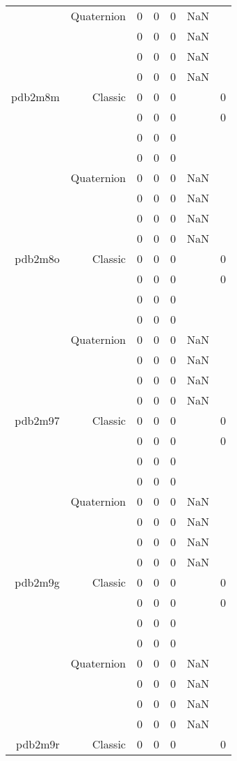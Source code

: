 \begin{xltabular}{\textwidth}{r|rcccSc}
& Quaternion & 0 & 0 & 0 & NaN & \\
& & 0 & 0 & 0 & NaN & \\
& & 0 & 0 & 0 & NaN & \\
& & 0 & 0 & 0 & NaN & \\ \addlinespace
pdb2m8m & Classic & 0 & 0 & 0 & & 0 \\
& & 0 & 0 & 0 & & 0 \\
& & 0 & 0 & 0 & & \\
& & 0 & 0 & 0 & & \\
& Quaternion & 0 & 0 & 0 & NaN & \\
& & 0 & 0 & 0 & NaN & \\
& & 0 & 0 & 0 & NaN & \\
& & 0 & 0 & 0 & NaN & \\ \addlinespace
pdb2m8o & Classic & 0 & 0 & 0 & & 0 \\
& & 0 & 0 & 0 & & 0 \\
& & 0 & 0 & 0 & & \\
& & 0 & 0 & 0 & & \\
& Quaternion & 0 & 0 & 0 & NaN & \\
& & 0 & 0 & 0 & NaN & \\
& & 0 & 0 & 0 & NaN & \\
& & 0 & 0 & 0 & NaN & \\ \addlinespace
pdb2m97 & Classic & 0 & 0 & 0 & & 0 \\
& & 0 & 0 & 0 & & 0 \\
& & 0 & 0 & 0 & & \\
& & 0 & 0 & 0 & & \\
& Quaternion & 0 & 0 & 0 & NaN & \\
& & 0 & 0 & 0 & NaN & \\
& & 0 & 0 & 0 & NaN & \\
& & 0 & 0 & 0 & NaN & \\ \addlinespace
pdb2m9g & Classic & 0 & 0 & 0 & & 0 \\
& & 0 & 0 & 0 & & 0 \\
& & 0 & 0 & 0 & & \\
& & 0 & 0 & 0 & & \\
& Quaternion & 0 & 0 & 0 & NaN & \\
& & 0 & 0 & 0 & NaN & \\
& & 0 & 0 & 0 & NaN & \\
& & 0 & 0 & 0 & NaN & \\ \addlinespace
pdb2m9r & Classic & 0 & 0 & 0 & & 0 \\

\end{xltabular}
